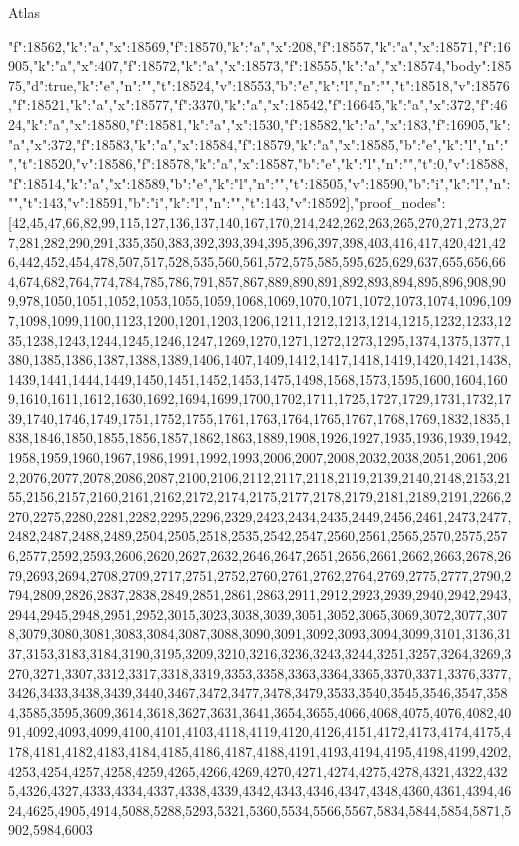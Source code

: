 \begin{lexlean}{Atlas}
\begin{coremodule}
{"f":18562,"k":"a","x":18569},{"f":18570,"k":"a","x":208},{"f":18557,"k":"a","x":18571},{"f":16905,"k":"a","x":407},{"f":18572,"k":"a","x":18573},{"f":18555,"k":"a","x":18574},{"body":18575,"d":true,"k":"e","n":"","t":18524,"v":18553},{"b":"e","k":"l","n":"","t":18518,"v":18576},{"f":18521,"k":"a","x":18577},{"f":3370,"k":"a","x":18542},{"f":16645,"k":"a","x":372},{"f":4624,"k":"a","x":18580},{"f":18581,"k":"a","x":1530},{"f":18582,"k":"a","x":183},{"f":16905,"k":"a","x":372},{"f":18583,"k":"a","x":18584},{"f":18579,"k":"a","x":18585},{"b":"e","k":"l","n":"","t":18520,"v":18586},{"f":18578,"k":"a","x":18587},{"b":"e","k":"l","n":"","t":0,"v":18588},{"f":18514,"k":"a","x":18589},{"b":"e","k":"l","n":"","t":18505,"v":18590},{"b":"i","k":"l","n":"","t":143,"v":18591},{"b":"i","k":"l","n":"","t":143,"v":18592}],"proof_nodes":[42,45,47,66,82,99,115,127,136,137,140,167,170,214,242,262,263,265,270,271,273,277,281,282,290,291,335,350,383,392,393,394,395,396,397,398,403,416,417,420,421,426,442,452,454,478,507,517,528,535,560,561,572,575,585,595,625,629,637,655,656,664,674,682,764,774,784,785,786,791,857,867,889,890,891,892,893,894,895,896,908,909,978,1050,1051,1052,1053,1055,1059,1068,1069,1070,1071,1072,1073,1074,1096,1097,1098,1099,1100,1123,1200,1201,1203,1206,1211,1212,1213,1214,1215,1232,1233,1235,1238,1243,1244,1245,1246,1247,1269,1270,1271,1272,1273,1295,1374,1375,1377,1380,1385,1386,1387,1388,1389,1406,1407,1409,1412,1417,1418,1419,1420,1421,1438,1439,1441,1444,1449,1450,1451,1452,1453,1475,1498,1568,1573,1595,1600,1604,1609,1610,1611,1612,1630,1692,1694,1699,1700,1702,1711,1725,1727,1729,1731,1732,1739,1740,1746,1749,1751,1752,1755,1761,1763,1764,1765,1767,1768,1769,1832,1835,1838,1846,1850,1855,1856,1857,1862,1863,1889,1908,1926,1927,1935,1936,1939,1942,1958,1959,1960,1967,1986,1991,1992,1993,2006,2007,2008,2032,2038,2051,2061,2062,2076,2077,2078,2086,2087,2100,2106,2112,2117,2118,2119,2139,2140,2148,2153,2155,2156,2157,2160,2161,2162,2172,2174,2175,2177,2178,2179,2181,2189,2191,2266,2270,2275,2280,2281,2282,2295,2296,2329,2423,2434,2435,2449,2456,2461,2473,2477,2482,2487,2488,2489,2504,2505,2518,2535,2542,2547,2560,2561,2565,2570,2575,2576,2577,2592,2593,2606,2620,2627,2632,2646,2647,2651,2656,2661,2662,2663,2678,2679,2693,2694,2708,2709,2717,2751,2752,2760,2761,2762,2764,2769,2775,2777,2790,2794,2809,2826,2837,2838,2849,2851,2861,2863,2911,2912,2923,2939,2940,2942,2943,2944,2945,2948,2951,2952,3015,3023,3038,3039,3051,3052,3065,3069,3072,3077,3078,3079,3080,3081,3083,3084,3087,3088,3090,3091,3092,3093,3094,3099,3101,3136,3137,3153,3183,3184,3190,3195,3209,3210,3216,3236,3243,3244,3251,3257,3264,3269,3270,3271,3307,3312,3317,3318,3319,3353,3358,3363,3364,3365,3370,3371,3376,3377,3426,3433,3438,3439,3440,3467,3472,3477,3478,3479,3533,3540,3545,3546,3547,3584,3585,3595,3609,3614,3618,3627,3631,3641,3654,3655,4066,4068,4075,4076,4082,4091,4092,4093,4099,4100,4101,4103,4118,4119,4120,4126,4151,4172,4173,4174,4175,4178,4181,4182,4183,4184,4185,4186,4187,4188,4191,4193,4194,4195,4198,4199,4202,4253,4254,4257,4258,4259,4265,4266,4269,4270,4271,4274,4275,4278,4321,4322,4325,4326,4327,4333,4334,4337,4338,4339,4342,4343,4346,4347,4348,4360,4361,4394,4624,4625,4905,4914,5088,5288,5293,5321,5360,5534,5566,5567,5834,5844,5854,5871,5902,5984,6003
\end{coremodule}
\end{lexlean}
